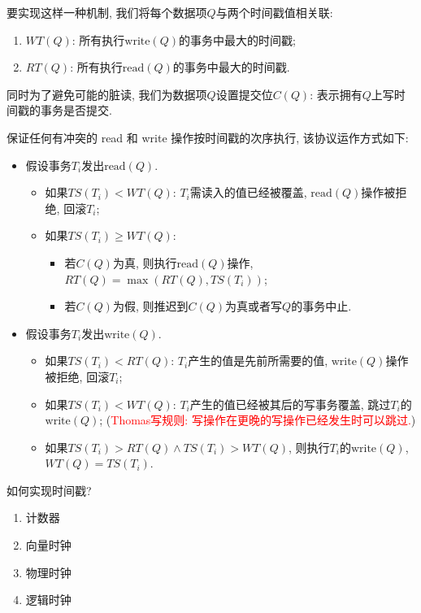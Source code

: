要实现这样一种机制, 我们将每个数据项$Q$与两个时间戳值相关联:
\begin{enumerate}
    \item $WT(Q)$: 所有执行$\text{write}(Q)$的事务中最大的时间戳;
    \item $RT(Q)$: 所有执行$\text{read}(Q)$的事务中最大的时间戳.
\end{enumerate}

同时为了避免可能的脏读, 我们为数据项$Q$设置提交位$C(Q)$: 表示拥有$Q$上写时间戳的事务是否提交.

\begin{definition}
  保证任何有冲突的 read 和 write 操作按时间戳的次序执行, 该协议运作方式如下:
  \begin{itemize}
    \item 假设事务$T_i$发出$\text{read}(Q)$.
    \begin{itemize}
      \item 如果$TS(T_i)<WT(Q)$: $T_i$需读入的值已经被覆盖, $\text{read}(Q)$操作被拒绝, 回滚$T_i$;
      \item 如果$TS(T_i)\geq WT(Q)$: 
      \begin{itemize}
        \item 若$C(Q)$为真, 则执行$\text{read}(Q)$操作, $RT(Q)=\max(RT(Q), TS(T_i))$;
        \item 若$C(Q)$为假, 则推迟到$C(Q)$为真或者写$Q$的事务中止.
      \end{itemize}
    \end{itemize}
    \item 假设事务$T_i$发出$\text{write}(Q)$.
    \begin{itemize}
      \item 如果$TS(T_i)<RT(Q)$: $T_i$产生的值是先前所需要的值, $\text{write}(Q)$操作被拒绝, 回滚$T_i$;
      \item 如果$TS(T_i)<WT(Q)$: $T_i$产生的值已经被其后的写事务覆盖, 跳过$T_i$的$\text{write}(Q)$; (\textcolor{red}{Thomas写规则: 写操作在更晚的写操作已经发生时可以跳过.})
      \item 如果$TS(T_i)>RT(Q) \land TS(T_i) > WT(Q)$, 则执行$T_i$的$\text{write}(Q)$, $WT(Q)=TS(T_i)$.
    \end{itemize}
  \end{itemize}
\end{definition}

如何实现时间戳?
\begin{enumerate}
    \item 计数器
    \item 向量时钟
    \item 物理时钟
    \item 逻辑时钟
\end{enumerate}



